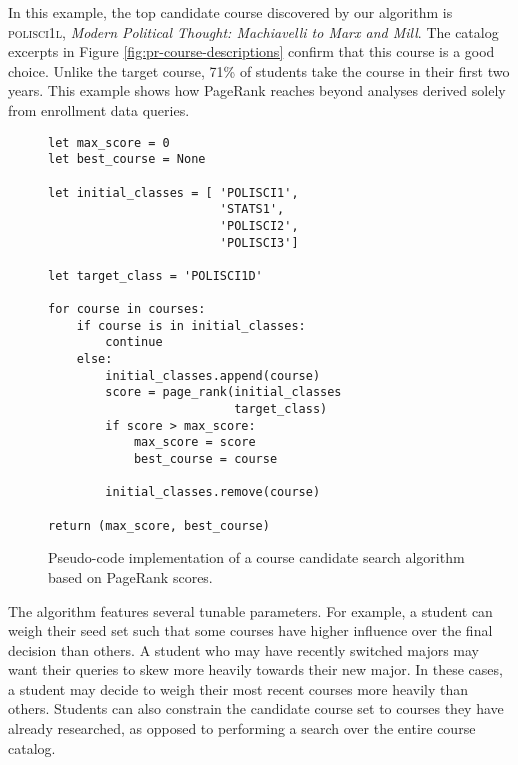 In this example, the top candidate course discovered by our algorithm
is \textsc{polisci1l}, {\em Modern Political Thought: Machiavelli to Marx
  and Mill}. The catalog excerpts in Figure
\ref{fig:pr-course-descriptions} confirm that this course is a good
choice. Unlike the target course, 71\% of students take the course in
their first two years. This example shows how PageRank reaches beyond
analyses derived solely from enrollment data queries.


\lstset{language=Python}          %

\begin{figure}
    \begin{lstlisting}[frame=single] 
let max_score = 0
let best_course = None 

let initial_classes = [ 'POLISCI1',
                        'STATS1',
                        'POLISCI2',
                        'POLISCI3']
                        
let target_class = 'POLISCI1D'

for course in courses:
    if course is in initial_classes:
        continue
    else:
        initial_classes.append(course)
        score = page_rank(initial_classes
                          target_class)
        if score > max_score:
            max_score = score
            best_course = course
        
        initial_classes.remove(course)

return (max_score, best_course)
\end{lstlisting}
\caption{Pseudo-code implementation of a course candidate search algorithm based on PageRank scores.}
\label{fig:course-recommendation-algorithm}
\end{figure}

The algorithm features several tunable parameters. For example, a
student can weigh their seed set such that some courses have higher
influence over the final decision than others. A student who may have
recently switched majors may want their queries to skew more heavily
towards their new major. In these cases, a student may decide to weigh
their most recent courses more heavily than others. Students can also
constrain the candidate course set to courses they have already
researched, as opposed to performing a search over the entire course
catalog.
